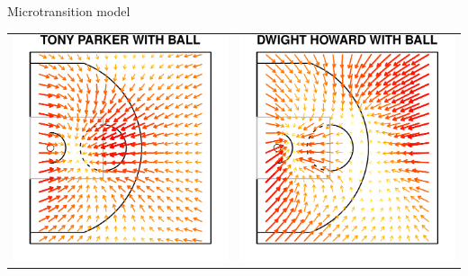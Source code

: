 \documentclass[10pt]{beamer}
\begin{document}
\begin{frame}{Microtransition model}
{\begin{center}
\begin{tabular}{cc}
\includegraphics[scale=0.32]{graphics/parker_with} & \includegraphics[scale=0.32]{graphics/howard_with}

\end{tabular}
\end{center}}
\end{frame}
\end{document}
